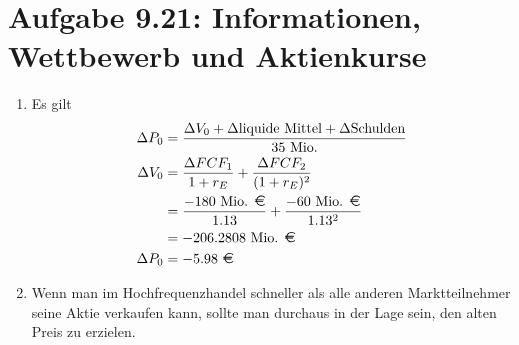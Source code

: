 \documentclass{article}
\begin{document}
	\section*{Aufgabe 9.21: Informationen, Wettbewerb und Aktienkurse}
	\begin{enumerate}[label=(\alph*)]
		\item Es gilt
		\begin{align}
			\Delta P_0 &= \frac{\Delta V_0 + \Delta\text{liquide Mittel} + \Delta\text{Schulden}}{35\text{ Mio.}} \notag \\
			\Delta V_0 &= \frac{\Delta FCF_1}{1+r_E} + \frac{\Delta FCF_2}{(1+r_E)^2} \notag \\
			&= \frac{-180\text{ Mio. \EUR}}{1.13} + \frac{-60\text{ Mio. \EUR}}{1.13^2} \notag \\
			&= -206.2808\text{ Mio. \EUR} \notag \\
			\Delta P_0 &= -5.98 \text{ \EUR} \notag
		\end{align}
		\item Wenn man im Hochfrequenzhandel schneller als alle anderen Marktteilnehmer seine Aktie verkaufen kann, sollte man durchaus in der Lage sein, den alten Preis zu erzielen.
	\end{enumerate}
\end{document}
